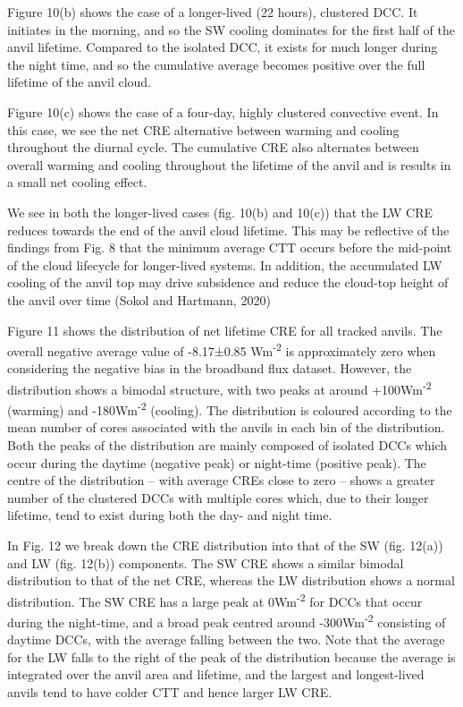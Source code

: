 Figure 10(b) shows the case of a longer-lived (22 hours), clustered DCC.
It initiates in the morning, and so the SW cooling dominates for the
first half of the anvil lifetime. Compared to the isolated DCC, it
exists for much longer during the night time, and so the cumulative
average becomes positive over the full lifetime of the anvil cloud.

Figure 10(c) shows the case of a four-day, highly clustered convective
event. In this case, we see the net CRE alternative between warming and
cooling throughout the diurnal cycle. The cumulative CRE also alternates
between overall warming and cooling throughout the lifetime of the anvil
and is results in a small net cooling effect.

We see in both the longer-lived cases (fig. 10(b) and 10(c)) that the LW
CRE reduces towards the end of the anvil cloud lifetime. This may be
reflective of the findings from Fig. 8 that the minimum average CTT
occurs before the mid-point of the cloud lifecycle for longer-lived
systems. In addition, the accumulated LW cooling of the anvil top may
drive subsidence and reduce the cloud-top height of the anvil over time
(Sokol and Hartmann, 2020)

Figure 11 shows the distribution of net lifetime CRE for all tracked
anvils. The overall negative average value of -8.17±0.85
Wm\textsuperscript{-2} is approximately zero when considering the
negative bias in the broadband flux dataset. However, the distribution
shows a bimodal structure, with two peaks at around
+100Wm\textsuperscript{-2} (warming) and -180Wm\textsuperscript{-2}
(cooling). The distribution is coloured according to the mean number of
cores associated with the anvils in each bin of the distribution. Both
the peaks of the distribution are mainly composed of isolated DCCs which
occur during the daytime (negative peak) or night-time (positive peak).
The centre of the distribution -- with average CREs close to zero --
shows a greater number of the clustered DCCs with multiple cores which,
due to their longer lifetime, tend to exist during both the day- and
night time.

In Fig. 12 we break down the CRE distribution into that of the SW (fig.
12(a)) and LW (fig. 12(b)) components. The SW CRE shows a similar
bimodal distribution to that of the net CRE, whereas the LW distribution
shows a normal distribution. The SW CRE has a large peak at
0Wm\textsuperscript{-2} for DCCs that occur during the night-time, and a
broad peak centred around -300Wm\textsuperscript{-2} consisting of
daytime DCCs, with the average falling between the two. Note that the
average for the LW falls to the right of the peak of the distribution
because the average is integrated over the anvil area and lifetime, and
the largest and longest-lived anvils tend to have colder CTT and hence
larger LW CRE.

